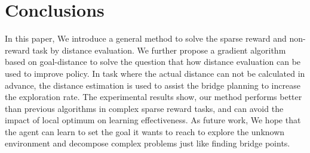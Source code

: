 \documentclass[8pt,twoside,a4paper]{article}
\begin{document}
\section{Conclusions}
In this paper, We introduce a general method to solve the sparse reward and non-reward task by distance evaluation. We further propose a gradient algorithm based on goal-distance to solve the question that how distance evaluation can be used to improve policy. In task where the actual distance can not be calculated in advance, the distance estimation is used to assist the bridge planning to increase the exploration rate. The experimental results show, our method performs better than previous algorithms in complex sparse reward tasks, and can avoid the impact of local optimum on learning effectiveness. As future work, We hope that the agent can learn to set the goal it wants to reach to explore the unknown environment and decompose complex problems just like finding bridge points.
   











\end{document}
